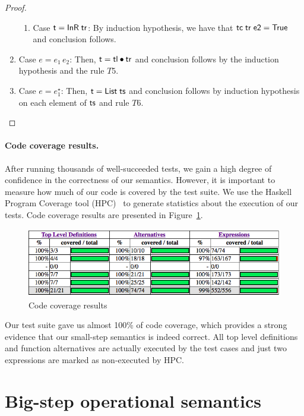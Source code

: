 \documentclass[oneside,12pt]{scrbook}
\theoremstyle{definition}
\newcommand{\C}[1]{\red{\mathsf{#1}}}
\newcommand{\F}[1]{\green{\mathsf{#1}}}
\newcommand{\V}[1]{\black{\mathsf{#1}}}
\theoremstyle{plain}
\theoremstyle{definition}
\begin{document}
\begin{proof}
\begin{enumerate}
\begin{enumerate}
			\item Case \ensuremath{\V{t}\mathrel{=}\C{InR}\;\V{tr}}: By induction hypothesis, we have that \ensuremath{\F{tc}\;\V{tr}\;\V{e2}\mathrel{=}\C{True}} and conclusion follows.
		\end{enumerate}
		\item Case $e = e_1\,e_2$: Then, \ensuremath{\V{t}\mathrel{=}\V{tl}\C{\:\bullet\:}\V{tr}} and conclusion follows by the induction
		hypothesis and the rule $T5$.
		\item Case $e = e_1^\star$: Then, \ensuremath{\V{t}\mathrel{=}\C{List}\;\V{ts}} and conclusion follows by induction hypothesis
		on each element of \ensuremath{\V{ts}} and rule $T6$.
	\end{enumerate}
\end{proof}

\paragraph{Code coverage results.}

After running thousands of well-succeeded tests, we gain a high degree of confidence in the correctness
of our semantics. However, it is important to measure how much of our code is covered by the test suite.
We use the Haskell Program Coverage tool (HPC)~\cite{Gill2007} to generate statistics about the execution of our tests.
Code coverage results are presented in Figure~\ref{figure:coverage}.

\begin{figure}[h!]
	\includegraphics[width=\linewidth]{coverage-results.png}
	\caption{Code coverage results}
	\label{figure:coverage}
\end{figure}

Our test suite gave us almost 100\% of code coverage, which provides a strong evidence that our small-step semantics
is indeed correct. All top level definitions and function alternatives are actually executed by the test cases
and just two expressions are marked as non-executed by HPC.


\section{Big-step operational semantics}\label{section:bigstepsemantics}
\end{document}
